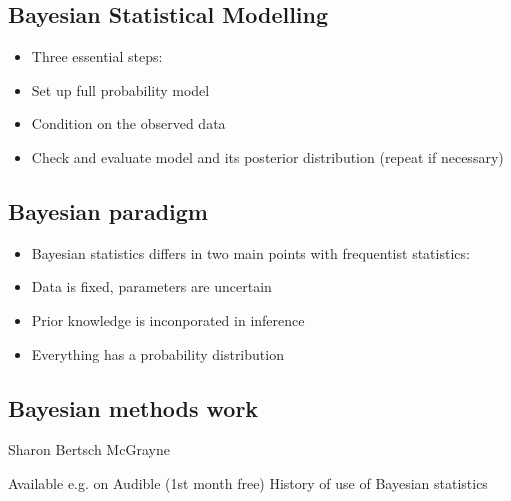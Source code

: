 \documentclass[letterpaper,10pt,english]{jupyterBook}
\begin{document}
\subsection{Bayesian Statistical Modelling}
\label{\detokenize{Lecture 1:bayesian-statistical-modelling}}\begin{itemize}
\item {} 
\sphinxAtStartPar
Three essential steps:

\item {} 
\sphinxAtStartPar
Set up full probability model

\item {} 
\sphinxAtStartPar
Condition on the observed data

\item {} 
\sphinxAtStartPar
Check and evaluate model and its posterior distribution (repeat if necessary)

\end{itemize}


\subsection{Bayesian paradigm}
\label{\detokenize{Lecture 1:bayesian-paradigm}}\begin{itemize}
\item {} 
\sphinxAtStartPar
Bayesian statistics differs in two main points with frequentist statistics:

\item {} 
\sphinxAtStartPar
Data is fixed, parameters are uncertain

\item {} 
\sphinxAtStartPar
Prior knowledge is inconporated in inference

\item {} 
\sphinxAtStartPar
Everything has a probability distribution

\end{itemize}


\subsection{Bayesian methods work}
\label{\detokenize{Lecture 1:bayesian-methods-work}}
\sphinxAtStartPar
Sharon Bertsch McGrayne



\sphinxAtStartPar
Available e.g. on Audible (1st month free)
History of use of Bayesian statistics
\end{document}
